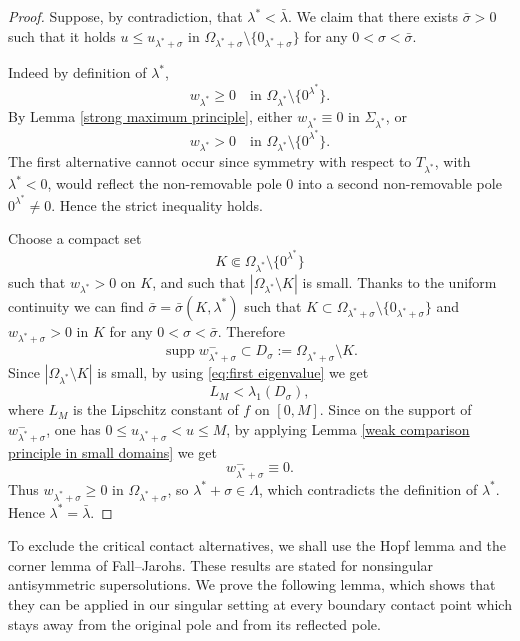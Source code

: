 \documentclass[11pt,a4paper]{article}
\newcommand{\supp}{\operatorname{supp}}
\begin{document}
\begin{proof}
Suppose, by contradiction, that \(\lambda^*<\bar\lambda\). We claim that there exists $\bar{\sigma} > 0$ such that it holds $u \le u_{\lambda^{*}+\sigma}$ in $\Omega_{\lambda^{*}+\sigma} \setminus \{0_{\lambda^{*}+\sigma}\}$ for any $0<\sigma <\bar{\sigma}$.

Indeed by definition of \(\lambda^*\),
\[
w_{\lambda^*}\ge0
\quad\text{in }\Omega_{\lambda^*}\setminus\{0^{\lambda^*}\}.
\]
By Lemma \ref{strong maximum principle}, either \(w_{\lambda^*}\equiv0\) in \(\Sigma_{\lambda^*}\), or
\[
w_{\lambda^*}>0
\quad\text{in }\Omega_{\lambda^*}\setminus\{0^{\lambda^*}\}.
\]
The first alternative cannot occur since symmetry with respect to \(T_{\lambda^*}\), with \(\lambda^*<0\), would reflect the non-removable pole \(0\) into a second non-removable pole \(0^{\lambda^*}\neq0\). Hence the strict inequality holds.

Choose a compact set
\[
K\Subset\Omega_{\lambda^*}\setminus\{0^{\lambda^*}\}
\]
such that \(w_{\lambda^*}>0\) on \(K\), and such that \(|\Omega_{\lambda^*}\setminus K|\) is small. Thanks to the uniform continuity we can find $\bar{\sigma}=\bar{\sigma}(K,\lambda^{*})$ such that $K \subset \Omega_{\lambda^{*}+\sigma} \setminus \{0_{\lambda^{*}+\sigma}\}$ and $w_{\lambda^{*}+\sigma} >0$ in $K$ for any $0<\sigma<\bar{\sigma}.$  Therefore 
\[
\supp w_{\lambda^*+\sigma}^-
\subset
D_\sigma:=\Omega_{\lambda^*+\sigma}\setminus K.
\]
Since $|\Omega_{\lambda^*}\setminus K|$ is small, by using \eqref{eq:first eigenvalue} we get
\[
L_M<\lambda_1(D_\sigma),
\]
where \(L_M\) is the Lipschitz constant of \(f\) on \([0,M]\). Since on the support of \(w_{\lambda^*+\sigma}^-\), one has \(0\le u_{\lambda^*+\sigma}<u\le M\), by applying Lemma \ref{weak comparison principle in small domains} we get
\[
w_{\lambda^*+\sigma}^-\equiv0.
\]
Thus \(w_{\lambda^*+\sigma}\ge0\) in \(\Omega_{\lambda^*+\sigma}\), so \(\lambda^*+\sigma\in\Lambda\), which contradicts the definition of \(\lambda^*\). Hence \(\lambda^*=\bar\lambda\).
\end{proof}


To exclude the critical contact alternatives, we shall use the Hopf
lemma and the corner lemma of Fall--Jarohs. These results are stated for
nonsingular antisymmetric supersolutions. We prove the following lemma, which shows that they can be applied in our singular setting
at every boundary contact point which stays away from the original pole and from
its reflected pole.
\end{document}

